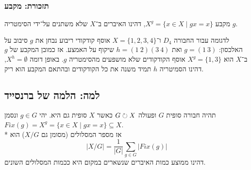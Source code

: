 \subsubsection{תזכורת: מקבע}
מקבע $X^g = \{ x \in X \mid gx = x \}$, דהינו האיברים ב־$X$ שלא משתנים על־ידי הסימטריה $g$.

לדגומה עבור החבורה $D_4$ ו־$X = \{1, 2, 3, 4\}$ אוסף קודקודי ריבוע נבחן את $g$ סיבוב על האלכסון: $g = (1\ 3)$ ואת $h = (1\ 2)(3\ 4)$ שיקוף על האמצע.
אז כמובן המקבע של $g$ ב־$X$ הוא $X^g = \{1, 3\}$ אוסף הקודקודים שלא מושפעים מהסימטריה $g$.
באופן דומה $X^h = \emptyset$, דהינו הסמיטריה $h$ תמיד משנה את כל הקודקודים ובהתאם המקבע הוא ריק.

\subsection{למה: הלמה של ברנסייד}
תהיה חבורה סופית $G$ ופעולה $G \circlearrowright X$ כאשר $X$ סופית גם היא.
יהי $g \in G$ ונסמן $Fix(g) = X^g = \{ x \in X \mid gx = x\} \subseteq X$. \\*
אז מספר המסלולים (מסומן גם $X/G$) הוא
\[
	|X/G| = \frac{1}{|G|} \sum_{g \in G} |Fix(g)|
\]
דהינו ממוצע כמות האיברים שנשארים במקום היא ככמות המסלולים השונים.
